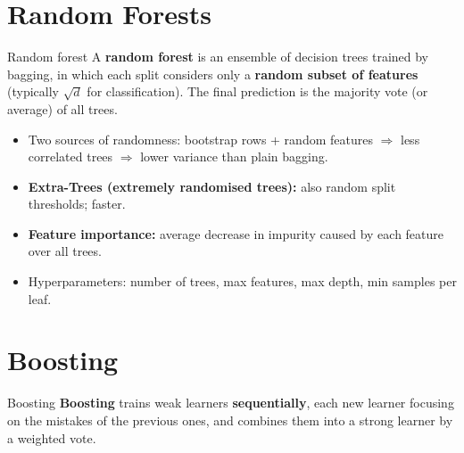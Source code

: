 \section{Random Forests}
\begin{dfn}{Random forest}
A \textbf{random forest} is an ensemble of decision trees trained by bagging, in which each split considers only a \textbf{random subset of features} (typically $\sqrt d$ for classification). The final prediction is the majority vote (or average) of all trees.
\end{dfn}
\begin{itemize}
  \item Two sources of randomness: bootstrap rows + random features $\Rightarrow$ less correlated trees $\Rightarrow$ lower variance than plain bagging.
  \item \textbf{Extra-Trees (extremely randomised trees):} also random split thresholds; faster.
  \item \textbf{Feature importance:} average decrease in impurity caused by each feature over all trees.
  \item Hyperparameters: number of trees, max features, max depth, min samples per leaf.
\end{itemize}

\section{Boosting}
\begin{dfn}{Boosting}
\textbf{Boosting} trains weak learners \textbf{sequentially}, each new learner focusing on the mistakes of the previous ones, and combines them into a strong learner by a weighted vote.
\end{dfn}

